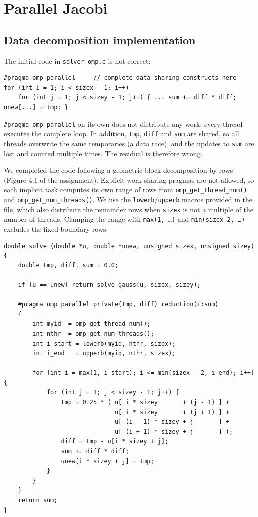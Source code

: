 \documentclass[11pt,a4paper]{article}
\begin{document}
\section{Parallel Jacobi}

\subsection{Data decomposition implementation}

The initial code in \texttt{solver-omp.c} is not correct:
\begin{lstlisting}
#pragma omp parallel     // complete data sharing constructs here
for (int i = 1; i < sizex - 1; i++)
    for (int j = 1; j < sizey - 1; j++) { ... sum += diff * diff; unew[...] = tmp; }
\end{lstlisting}
\texttt{\#pragma omp parallel} on its own does not distribute any work: every thread executes the complete loop. In addition, \texttt{tmp}, \texttt{diff} and \texttt{sum} are shared, so all threads overwrite the same temporaries (a data race), and the updates to \texttt{sum} are lost and counted multiple times. The residual is therefore wrong.

We completed the code following a geometric block decomposition by rows (Figure 4.1 of the assignment). Explicit work-sharing pragmas are not allowed, so each implicit task computes its own range of rows from \texttt{omp\_get\_thread\_num()} and \texttt{omp\_get\_num\_threads()}. We use the \texttt{lowerb}/\texttt{upperb} macros provided in the file, which also distribute the remainder rows when \texttt{sizex} is not a multiple of the number of threads. Clamping the range with \texttt{max(1, \dots)} and \texttt{min(sizex-2, \dots)} excludes the fixed boundary rows.

\begin{lstlisting}
double solve (double *u, double *unew, unsigned sizex, unsigned sizey) {
    double tmp, diff, sum = 0.0;

    if (u == unew) return solve_gauss(u, sizex, sizey);

    #pragma omp parallel private(tmp, diff) reduction(+:sum)
    {
        int myid  = omp_get_thread_num();
        int nthr  = omp_get_num_threads();
        int i_start = lowerb(myid, nthr, sizex);
        int i_end   = upperb(myid, nthr, sizex);

        for (int i = max(1, i_start); i <= min(sizex - 2, i_end); i++) {
            for (int j = 1; j < sizey - 1; j++) {
                tmp = 0.25 * ( u[ i * sizey       + (j - 1) ] +
                               u[ i * sizey       + (j + 1) ] +
                               u[ (i - 1) * sizey + j       ] +
                               u[ (i + 1) * sizey + j       ] );
                diff = tmp - u[i * sizey + j];
                sum += diff * diff;
                unew[i * sizey + j] = tmp;
            }
        }
    }
    return sum;
}
\end{lstlisting}
\end{document}
